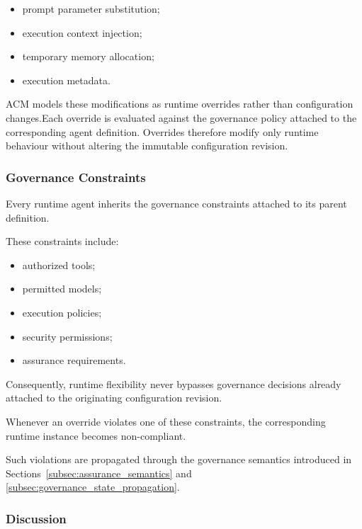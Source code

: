 \documentclass[10pt]{article}
\begin{document}
\begin{itemize}
\item prompt parameter substitution;
\item execution context injection;
\item temporary memory allocation;
\item execution metadata.
\end{itemize}

ACM models these modifications as runtime overrides rather than configuration
changes.Each override is evaluated against the governance policy attached to the
corresponding agent definition. Overrides therefore modify only runtime behaviour without altering the
immutable configuration revision.

\subsubsection{Governance Constraints}

Every runtime agent inherits the governance constraints attached to its parent
definition.

These constraints include:

\begin{itemize}
\item authorized tools;
\item permitted models;
\item execution policies;
\item security permissions;
\item assurance requirements.
\end{itemize}

Consequently, runtime flexibility never bypasses governance decisions already
attached to the originating configuration revision.

Whenever an override violates one of these constraints, the corresponding
runtime instance becomes non-compliant.

Such violations are propagated through the governance semantics introduced in
Sections~\ref{subsec:assurance_semantics} and
\ref{subsec:governance_state_propagation}.


\subsubsection{Discussion}
\end{document}
